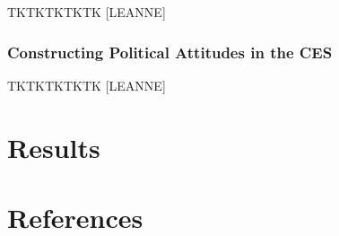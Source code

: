 \documentclass[
  12pt,
]{article}
\begin{document}
TKTKTKTKTK {[}LEANNE{]}

\hypertarget{constructing-political-attitudes-in-the-ces}{%
\subsubsection*{Constructing Political Attitudes in the CES}\label{constructing-political-attitudes-in-the-ces}}

TKTKTKTKTK {[}LEANNE{]}

\hypertarget{results}{%
\section*{Results}\label{results}}

\newpage

\hypertarget{references}{%
\section*{References}\label{references}}
\end{document}
